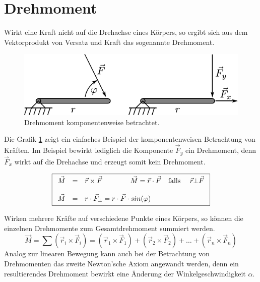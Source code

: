 \section{Drehmoment}
Wirkt eine Kraft nicht auf die Drehachse eines Körpers, so ergibt
sich aus dem Vektorprodukt von Versatz und Kraft das sogenannte
Drehmoment.

\begin{figure}[h!]
	\centering
	\includegraphics[scale=0.8]{../fig/drehmoment.pdf}
	\caption{Drehmoment komponentenweise betrachtet.}
	\label{fig:drehmoment}
\end{figure}

\noindent
Die Grafik \ref{fig:drehmoment} zeigt ein einfaches Beispiel der
komponentenweisen Betrachtung von Kräften. Im Beispiel bewirkt lediglich
die Komponente $\vec{F}_y$ ein Drehmoment, denn $\vec{F}_x$ wirkt auf
die Drehachse und erzeugt somit kein Drehmoment.

\[ \boxed{\begin{array}{l c l} 
	\vec{M} &=& \vec{r} \times \vec{F}
			\qquad \qquad
		\vec{M} = \vec{r} \cdot \vec{F}
			\quad \text{falls } \quad \vec{r} \bot \vec{F} \\
	& & \\ 
	\vec{M} 
		&=& r \cdot \vec{F}_\bot 
		= r \cdot \vec{F} \cdot sin(\varphi) \\
\end{array} }\]

\noindent
Wirken mehrere Kräfte auf verschiedene Punkte eines Körpers, so können
die einzelnen Drehmomente zum Gesamtdrehmoment summiert werden.
\[ \boxed{
	\vec{M} = \sum \left(\vec{r}_i \times \vec{F}_i\right)
	= \left(\vec{r}_1 \times \vec{F}_1 \right)
		+ \left( \vec{r}_2 \times \vec{F}_2 \right)
		+ \dots 
		+ \left( \vec{r}_n \times \vec{F}_n \right)
} \]
Analog zur linearen Bewegung kann auch bei der Betrachtung von Drehmomenten
das zweite Newton'sche Axiom angewandt werden, denn ein resultierendes
Drehmoment bewirkt eine Änderung der Winkelgeschwindigkeit $\alpha$.

